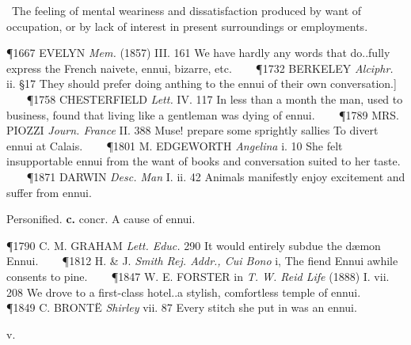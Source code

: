 \begin{description}[wide, labelwidth=!, labelindent=0pt]
\noindent {}

\vspace{-0.3cm}

\begin{myenumerate}
 The feeling of mental weariness and dissatisfaction produced by want of occupation, or by lack of interest in present surroundings or employments.

\P 1667 EVELYN  \textit{Mem.} (1857) III. 161 We have hardly any words that do..fully express the French naivete, ennui, bizarre, etc.    
\P 1732 BERKELEY  \textit{Alciphr.} ii. §17 They should prefer doing anthing to the ennui of their own conversation.]    
\P 1758 CHESTERFIELD  \textit{Lett.} IV. 117 In less than a month the man, used to business, found that living like a gentleman was dying of ennui.    
\P 1789 MRS. PIOZZI  \textit{Journ. France} II. 388 Muse! prepare some sprightly sallies To divert ennui at Calais.    
\P 1801 M. EDGEWORTH  \textit{Angelina} i. 10 She felt insupportable ennui from the want of books and conversation suited to her taste.    
\P 1871 DARWIN  \textit{Desc. Man} I. ii. 42 Animals manifestly enjoy excitement and suffer from ennui.

 Personified. \textbf{c.} concr. A cause of ennui.

\P 1790 C. M. GRAHAM  \textit{Lett. Educ.} 290 It would entirely subdue the dæmon Ennui.    
\P 1812 H. \& J.  \textit{Smith Rej. Addr., Cui Bono} i, The fiend Ennui awhile consents to pine.    
\P 1847 W. E. FORSTER in  \textit{T. W. Reid Life} (1888) I. vii. 208 We drove to a first-class hotel..a stylish, comfortless temple of ennui.    
\P 1849 C. BRONTË  \textit{Shirley} vii. 87 Every stitch she put in was an ennui.
\end{myenumerate}


 v.

\noindent {}

\vspace{-0.3cm}


\end{description}
